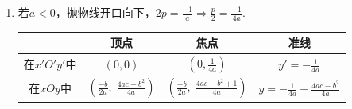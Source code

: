 \begin{solution}
\begin{enumerate}[(1)]
    \item 若$a<0$，抛物线开口向下，$2p=\frac{-1}{a}\Rightarrow \frac{p}{2}=\frac{-1}{4a}$.
\begin{center}
\begin{tabular}{c|ccc}
\hline
& 顶点 & 焦点& 准线\\
\hline
在$x'O'y'$中 &  $(0,0)$ &  $\left(0,\frac{1}{4a}\right)$ &  $y'=-\frac{1}{4a}$\\
在$xOy$中 &  $\left(\frac{-b}{2a},\; \frac{4ac-b^2}{4a}\right)$ &  $\left(\frac{-b}{2a},\; \frac{4ac-b^2+1}{4a}\right)$ &  $y=-\frac{1}{4a}+\frac{4ac-b^2}{4a}$\\
\hline
\end{tabular}
\end{center}
\end{enumerate}
\end{solution}


